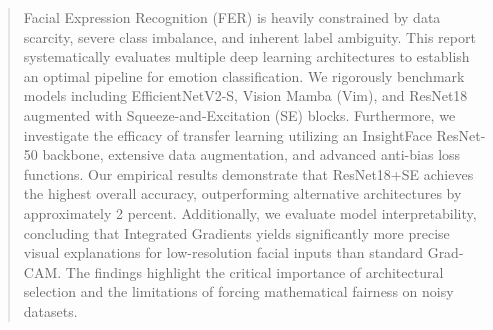 \begin{abstract}
Facial Expression Recognition (FER) is heavily constrained by data scarcity, severe class imbalance, and inherent label ambiguity. This report systematically evaluates multiple deep learning architectures to establish an optimal pipeline for emotion classification. We rigorously benchmark models including EfficientNetV2-S, Vision Mamba (Vim), and ResNet18 augmented with Squeeze-and-Excitation (SE) blocks. Furthermore, we investigate the efficacy of transfer learning utilizing an InsightFace ResNet-50 backbone, extensive data augmentation, and advanced anti-bias loss functions. Our empirical results demonstrate that ResNet18+SE achieves the highest overall accuracy, outperforming alternative architectures by approximately 2 percent. Additionally, we evaluate model interpretability, concluding that Integrated Gradients yields significantly more precise visual explanations for low-resolution facial inputs than standard Grad-CAM. The findings highlight the critical importance of architectural selection and the limitations of forcing mathematical fairness on noisy datasets.
\end{abstract}
